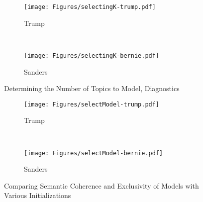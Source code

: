 \documentclass[12pt]{article}
\begin{document}
\begin{appendices}
\begin{refsection}
\begin{figure}[bp!]
\centering
   \begin{subfigure}[b]{0.6\textwidth}
	   \centering
	   \texttt{[image: Figures/selectingK-trump.pdf]}
	   \caption{Trump}
	   \label{fig:selectingK-trump} 
	\end{subfigure}
\\
	\begin{subfigure}[b]{0.6\textwidth}
		\centering
	   \texttt{[image: Figures/selectingK-bernie.pdf]}
	   \caption{Sanders}
	   \label{fig:selectingK-sanders}
	\end{subfigure}
	\caption{Determining the Number of Topics to Model, Diagnostics}\label{fig:selectingK}
\end{figure}

\begin{figure}[bp!]
\centering
   \begin{subfigure}[b]{0.6\textwidth}
	   \centering
	   \texttt{[image: Figures/selectModel-trump.pdf]}
	   \caption{Trump}
	   \label{fig:selectModel-trump} 
	\end{subfigure}
\\
	\begin{subfigure}[b]{0.6\textwidth}
		\centering
	   \texttt{[image: Figures/selectModel-bernie.pdf]}
	   \caption{Sanders}
	   \label{fig:selectModel-sanders}
	\end{subfigure}
	\caption{Comparing Semantic Coherence and Exclusivity of Models with Various Initializations}\label{fig:selectModel}
\end{figure}


\end{refsection}
\end{appendices}
\end{document}
